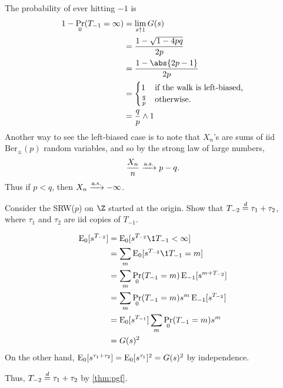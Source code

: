 The probability of ever hitting $-1$ is \begin{align*}
    1 - \Pr_0(T_{-1} = \infty) &= \lim_{s \uparrow 1} G(s) \\
        &= \frac{1 - \sqrt{1 - 4pq}}{2p} \\
        &= \frac{1 - \abs{2p - 1}}{2p} \\
        &= \begin{cases}
            1 & \text{if the walk is left-biased,} \\
            \frac{q}{p} & \text{otherwise.}
        \end{cases} \\
        &= \frac{q}{p} \wedge 1
\end{align*}
Another way to see the left-biased case is to note that $X_n$'s are sums of
iid $\mathrm{Ber}_{\pm}(p)$ random variables, and so by the strong law of
large numbers, \[
    \frac{X_n}{n} \xrightarrow{\text{a.s.}} p - q.
\] Thus if $p < q$, then $X_n \xrightarrow{\text{a.s.}} -\infty$.

\begin{exercise}
    Consider the SRW($p$) on $\Z$ started at the origin.
    Show that $T_{-2} \overset{d}{=} \tau_1 + \tau_2$, where $\tau_1$ and $\tau_2$ are
    iid copies of $T_{-1}$.
\end{exercise}
\begin{solution}
    \begin{align*}
        \E_0[s^{T_{-2}}] &= \E_0[s^{T_{-2}} \1{T_{-1} < \infty}] \\
            &= \sum_m \E_0[s^{T_{-2}} \1{T_{-1} = m}] \\
            &= \sum_m \Pr_0(T_{-1} = m) \E_{-1}[s^{m + T_{-2}}] \\
            &= \sum_m \Pr_0(T_{-1} = m) s^m \E_{-1}[s^{T_{-2}}] \\
            &= \E_0[s^{T_{-1}}] \sum_m \Pr_0(T_{-1} = m) s^m \\
            &= G(s)^2
    \end{align*}
    On the other hand, $\operatorname{\mathrm{E}}_0[s^{\tau_1 + \tau_2}] = \operatorname{\mathrm{E}}_0[s^{\tau_1}]^2
    = G(s)^2$ by independence.

    Thus, $T_{-2} \overset{d}{=} \tau_1 + \tau_2$ by \cref{thm:pgf}.
\end{solution}

